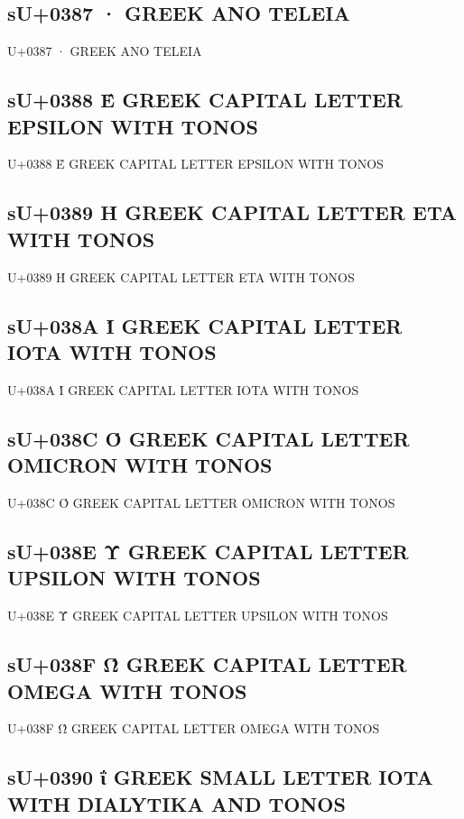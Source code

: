 \subsection{sU+0387 · GREEK ANO TELEIA}

U+0387 · GREEK ANO TELEIA

\subsection{sU+0388 Έ GREEK CAPITAL LETTER EPSILON WITH TONOS}

U+0388 Έ GREEK CAPITAL LETTER EPSILON WITH TONOS

\subsection{sU+0389 Ή GREEK CAPITAL LETTER ETA WITH TONOS}

U+0389 Ή GREEK CAPITAL LETTER ETA WITH TONOS

\subsection{sU+038A Ί GREEK CAPITAL LETTER IOTA WITH TONOS}

U+038A Ί GREEK CAPITAL LETTER IOTA WITH TONOS

\subsection{sU+038C Ό GREEK CAPITAL LETTER OMICRON WITH TONOS}

U+038C Ό GREEK CAPITAL LETTER OMICRON WITH TONOS

\subsection{sU+038E Ύ GREEK CAPITAL LETTER UPSILON WITH TONOS}

U+038E Ύ GREEK CAPITAL LETTER UPSILON WITH TONOS

\subsection{sU+038F Ώ GREEK CAPITAL LETTER OMEGA WITH TONOS}

U+038F Ώ GREEK CAPITAL LETTER OMEGA WITH TONOS

\subsection{sU+0390 ΐ GREEK SMALL LETTER IOTA WITH DIALYTIKA AND TONOS}

